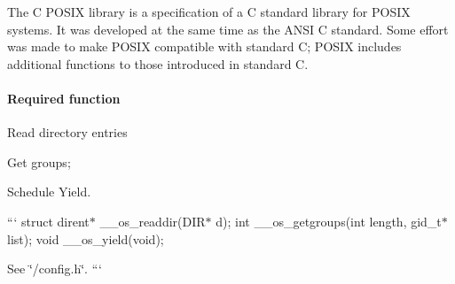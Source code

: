 The C P\+O\+S\+I\+X library is a specification of a C standard library for P\+O\+S\+I\+X systems. It was developed at the same time as the A\+N\+S\+I C standard. Some effort was made to make P\+O\+S\+I\+X compatible with standard C; P\+O\+S\+I\+X includes additional functions to those introduced in standard C.

\paragraph*{Required function}


\begin{DoxyItemize}
\item Read directory entries
\item Get groups;
\item Schedule Yield.
\end{DoxyItemize}

``` struct dirent$\ast$ \+\_\+\+\_\+os\+\_\+readdir(\+D\+I\+R$\ast$ d); int \+\_\+\+\_\+os\+\_\+getgroups(int length, gid\+\_\+t$\ast$ list); void \+\_\+\+\_\+os\+\_\+yield(void);

See \char`\"{}/config.\+h\char`\"{}. ``` 